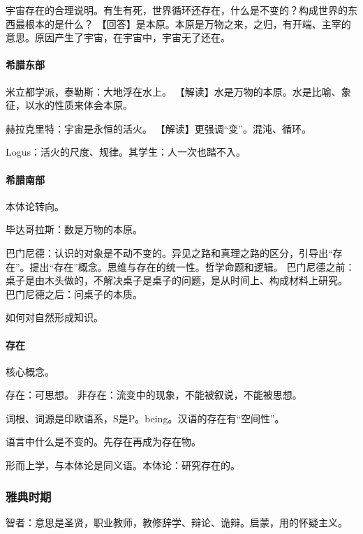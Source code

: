 \documentclass[UTF8]{../RepresentationUniverse}
\begin{document}
        宇宙存在的合理说明。有生有死，世界循环还存在，什么是不变的？构成世界的东西最根本的是什么？
        【回答】是本原。本原是万物之来，之归，有开端、主宰的意思。原因产生了宇宙，在宇宙中，宇宙无了还在。


        \paragraph{希腊东部}

        米立都学派，泰勒斯：大地浮在水上。
        【解读】水是万物的本原。水是比喻、象征，以水的性质来体会本原。

        赫拉克里特：宇宙是永恒的活火。
        【解读】更强调“变”。混沌、循环。

        Logus：活火的尺度、规律。其学生：人一次也踏不入。


        \paragraph{希腊南部}

        本体论转向。

        毕达哥拉斯：数是万物的本原。

        巴门尼德：认识的对象是不动不变的。异见之路和真理之路的区分，引导出“存在”。提出“存在”概念。思维与存在的统一性。哲学命题和逻辑。
        巴门尼德之前：桌子是由木头做的，不解决桌子是桌子的问题，是从时间上、构成材料上研究。
        巴门尼德之后：问桌子的本质。

        如何对自然形成知识。


        \paragraph{存在}

        核心概念。

        存在：可思想。
        非存在：流变中的现象，不能被叙说，不能被思想。

        词根、词源是印欧语系，S是P。being。汉语的存在有“空间性”。

        语言中什么是不变的。先存在再成为存在物。

        形而上学，与本体论是同义语。本体论：研究存在的。

        
        \subsubsection{雅典时期}

        智者：意思是圣贤，职业教师，教修辞学、辩论、诡辩。启蒙，用的怀疑主义。
\end{document}
